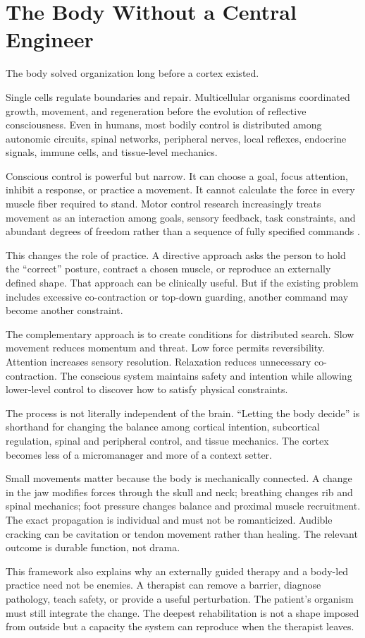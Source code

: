 \chapter{The Body Without a Central Engineer}\label{chapter-7-the-body-without-a-central-engineer}

The body solved organization long before a cortex existed.

Single cells regulate boundaries and repair. Multicellular organisms coordinated growth, movement, and regeneration before the evolution of reflective consciousness. Even in humans, most bodily control is distributed among autonomic circuits, spinal networks, peripheral nerves, local reflexes, endocrine signals, immune cells, and tissue-level mechanics.

Conscious control is powerful but narrow. It can choose a goal, focus attention, inhibit a response, or practice a movement. It cannot calculate the force in every muscle fiber required to stand. Motor control research increasingly treats movement as an interaction among goals, sensory feedback, task constraints, and abundant degrees of freedom rather than a sequence of fully specified commands \autocite{todorov2002optimal,latash2012bliss}.

This changes the role of practice. A directive approach asks the person to hold the ``correct'' posture, contract a chosen muscle, or reproduce an externally defined shape. That approach can be clinically useful. But if the existing problem includes excessive co-contraction or top-down guarding, another command may become another constraint.

The complementary approach is to create conditions for distributed search. Slow movement reduces momentum and threat. Low force permits reversibility. Attention increases sensory resolution. Relaxation reduces unnecessary co-contraction. The conscious system maintains safety and intention while allowing lower-level control to discover how to satisfy physical constraints.

The process is not literally independent of the brain. ``Letting the body decide'' is shorthand for changing the balance among cortical intention, subcortical regulation, spinal and peripheral control, and tissue mechanics. The cortex becomes less of a micromanager and more of a context setter.

Small movements matter because the body is mechanically connected. A change in the jaw modifies forces through the skull and neck; breathing changes rib and spinal mechanics; foot pressure changes balance and proximal muscle recruitment. The exact propagation is individual and must not be romanticized. Audible cracking can be cavitation or tendon movement rather than healing. The relevant outcome is durable function, not drama.

This framework also explains why an externally guided therapy and a body-led practice need not be enemies. A therapist can remove a barrier, diagnose pathology, teach safety, or provide a useful perturbation. The patient's organism must still integrate the change. The deepest rehabilitation is not a shape imposed from outside but a capacity the system can reproduce when the therapist leaves.
